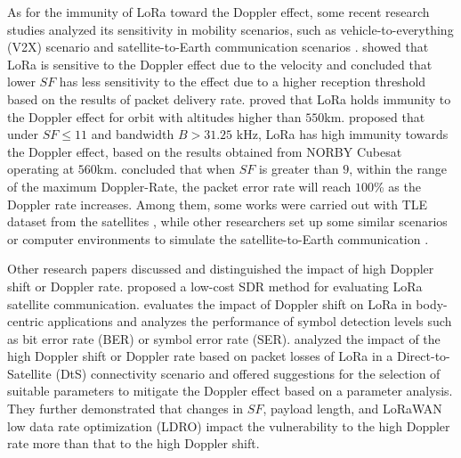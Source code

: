 \documentclass{IEEEtaes}
\theoremstyle{plain}
\begin{document}
As for the immunity of LoRa toward the Doppler effect, some recent research studies analyzed its sensitivity in mobility scenarios, such as vehicle-to-everything (V2X) scenario \cite{torres2021experimental, li2018lora}
and satellite-to-Earth communication scenarios \cite{doroshkin2018laboratory,doroshkin2019experimental,zadorozhny2022first,cao2021influence,colombo2022low,ameloot2021characterizing,ullah2023understanding,lapapan2021lora,ben2022new,kang2022regression}.  
\cite{torres2021experimental, li2018lora} showed that LoRa is sensitive to the Doppler effect due to the velocity and concluded that lower $SF$ has less sensitivity to the effect due to a higher reception threshold based on the results of packet delivery rate.
\cite{doroshkin2018laboratory,doroshkin2019experimental} proved that LoRa holds immunity to the Doppler effect for orbit with altitudes higher than $550$km. \cite{zadorozhny2022first} proposed that under $SF \leq 11$ and bandwidth $B> 31.25$ kHz, LoRa has high immunity towards the Doppler effect, based on the results obtained from NORBY Cubesat operating at $560$km.
\cite{cao2021influence} concluded that when $SF$ is greater than $9$, within the range of the maximum Doppler-Rate, the packet error rate will reach $100$\% as the Doppler rate increases.  
Among them, some works were carried out with TLE dataset from the satellites \cite{zadorozhny2022first}, while other researchers set up some similar scenarios or computer environments to simulate the satellite-to-Earth communication \cite{doroshkin2018laboratory,doroshkin2019experimental,cao2021influence}.

Other research papers discussed and distinguished the impact of high Doppler shift or Doppler rate. \cite{colombo2022low} proposed a low-cost SDR method for evaluating LoRa satellite communication. 
\cite{ameloot2021characterizing} evaluates the impact of Doppler shift on LoRa in body-centric applications and analyzes the performance of symbol detection levels such as bit error rate (BER) or symbol error rate (SER). 
\cite{ullah2023understanding} analyzed the impact of the high Doppler shift or Doppler rate based on packet losses of LoRa in a Direct-to-Satellite (DtS) connectivity scenario and offered suggestions for the selection of suitable parameters to mitigate the Doppler effect based on a parameter analysis. They further demonstrated that changes in $SF$, payload length, and LoRaWAN low data rate optimization (LDRO) impact the vulnerability to the high Doppler rate more than that to the high Doppler shift.
\end{document}
